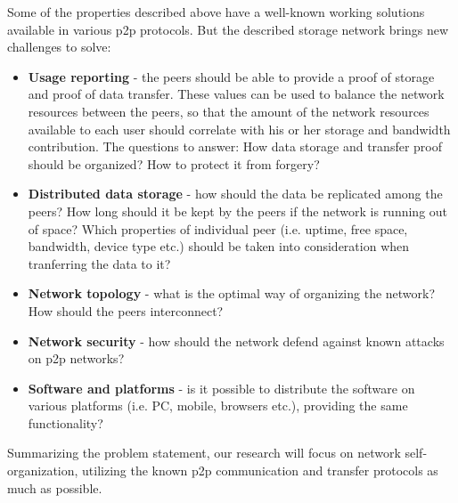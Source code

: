 Some of the properties described above have a well-known working solutions
available in various p2p protocols. But the described storage network brings
new challenges to solve:

\begin{itemize}
\item \textbf{Usage reporting} - the peers should be able to provide
  a proof of storage and proof of data transfer. These values can be used
  to balance the network resources between the peers, so that the amount
  of the network resources available to each user should correlate with
  his or her storage and bandwidth contribution. The questions to answer:
  How data storage and transfer proof should be organized? How to protect
  it from forgery?

\item \textbf{Distributed data storage} - how should the data be replicated
  among the peers? How long should it be kept by the peers if the network
  is running out of space? Which properties of individual peer (i.e. uptime,
  free space, bandwidth, device type etc.) should be  taken into consideration
  when tranferring the data to it?

\item \textbf{Network topology} - what is the optimal way of organizing the
  network? How should the peers interconnect?

\item \textbf{Network security} - how should the network defend against known
  attacks on p2p networks?

\item \textbf{Software and platforms} - is it possible to distribute the software
  on various platforms (i.e. PC, mobile, browsers etc.), providing the same
  functionality?
\end{itemize}

Summarizing the problem statement, our research will focus on network
self-organization, utilizing the known p2p communication and transfer protocols
as much as possible.
